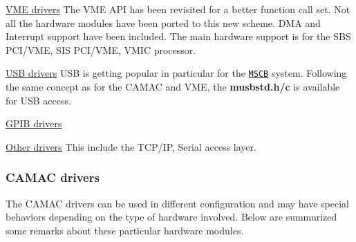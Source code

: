 \begin{DoxyItemize}
\item \hyperlink{FE_Hardware_VME_drivers}{VME drivers} The VME API has been revisited for a better function call set. Not all the hardware modules have been ported to this new scheme. DMA and Interrupt support have been included. The main hardware support is for the SBS PCI/VME, SIS PCI/VME, VMIC processor.
\end{DoxyItemize}


\begin{DoxyItemize}
\item \hyperlink{FE_Hardware_USB_drivers}{USB drivers} USB is getting popular in particular for the \href{http://midas.psi.ch/mscb/}{\tt MSCB} system. Following the same concept as for the CAMAC and VME, the {\bfseries musbstd.h/c} is available for USB access.
\end{DoxyItemize}


\begin{DoxyItemize}
\item \hyperlink{FE_Hardware_GPIB_drivers}{GPIB drivers}
\end{DoxyItemize}


\begin{DoxyItemize}
\item \hyperlink{FE_Hardware_Other_drivers}{Other drivers} This include the TCP/IP, Serial access layer.
\end{DoxyItemize}

\label{FE_Hardware_idx_Hardware_drivers_CAMAC}
\hypertarget{FE_Hardware_idx_Hardware_drivers_CAMAC}{}
 

 \hypertarget{FE_Hardware_CAMAC_drivers}{}\subsubsection{CAMAC drivers}\label{FE_Hardware_CAMAC_drivers}
The CAMAC drivers can be used in different configuration and may have special behaviors depending on the type of hardware involved. Below are summurized some remarks about these particular hardware modules.


